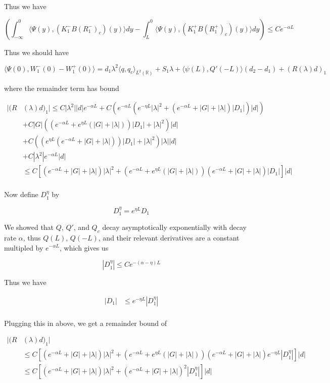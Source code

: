 \documentclass[12pt]{article}
\def\R{{\mathbb R}}
\begin{document}
\begin{enumerate}
Thus we have

\[
\left( \int_{-\infty}^0 \langle \Psi(y), (K_1^- B (R_1^-)_c)(y) \rangle dy - \int_{L}^0 \langle \Psi(y), (K_1^+ B (R_1^+)_c)(y) \rangle dy \right) \leq C e^{-\alpha L}
\]

\end{enumerate}

Thus we should have

\[
\langle \Psi(0), W_1^-(0) - W_1^+(0) \rangle = 
d_1 \lambda^2 \langle q, q_c \rangle_{L^2(\R)} + S_1 \lambda + \langle \psi(L), Q'(-L) \rangle(d_2 - d_1) + (R(\lambda)d)_1
\]

where the remainder term has bound

\begin{align*}
|(R&(\lambda)d)_1| \leq C |\lambda^2| |d| e^{-\alpha L} + C \left( e^{-\alpha L} (e^{-\eta L}|\lambda|^2 + (e^{-\alpha L} + |G| + |\lambda|)|D_1|)|d| \right) \\
&+ C|G| \left( \left( e^{-\alpha L} + e^{\eta L}(|G| + |\lambda|)  \right) |D_1| + |\lambda|^2 \right)|d| \\
&+ C \left(\left( e^{\eta L}(e^{-\alpha L} + |G| + |\lambda|) \right)|D_1| + |\lambda|^2 \right)|\lambda| |d| \\
&+ C |\lambda^2| e^{-\alpha L} |d| \\
&\leq C \left[ (e^{-\alpha L} + |G| + |\lambda|) |\lambda|^2 + (e^{-\alpha L} + e^{\eta L}(|G| + |\lambda|))(e^{-\alpha L} + |G| + |\lambda|) |D_1| \right] |d| \\
\end{align*}

Now define $D_1^{\eta}$ by

\[
D_1^{\eta} = e^{\eta L} D_1
\]

We showed that $Q$, $Q'$, and $Q_c$ decay asymptotically exponentially with decay rate $\alpha$, thus $Q(L)$, $Q(-L)$, and their relevant derivatives are a constant multipled by $e^{-\alpha L}$, which gives us

\[
|D_1^{\eta}| \leq C e^{-(\alpha - \eta)L}
\]

Thus we have

\begin{align*}
|D_1| &\leq e^{-\eta L} |D_1^{\eta}| \\
\end{align*}

Plugging this in above, we get a remainder bound of

\begin{align*}
|(R&(\lambda)d)_1|  \\
&\leq C \left[ (e^{-\alpha L} + |G| + |\lambda|) |\lambda|^2 + (e^{-\alpha L} + e^{\eta L}(|G| + |\lambda|))(e^{-\alpha L} + |G| + |\lambda|)e^{-\eta L} |D_1^{\eta}|  \right] |d| \\
&\leq C \left[ (e^{-\alpha L} + |G| + |\lambda|)|\lambda|^2 + (e^{-\alpha L} + |G| + |\lambda|)^2 |D_1^{\eta}|  \right] |d|
\end{align*}
\end{document}

